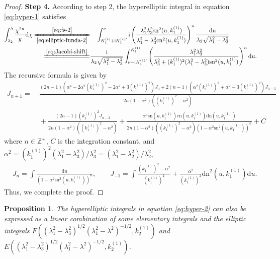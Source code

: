 \documentclass[11pt,reqno]{amsart}
\newcommand{\ii}{\mathrm{i}}
\newcommand{\sn}{\mathrm{sn}}
\newcommand{\cn}{\mathrm{cn}}
\newcommand{\dn}{\mathrm{dn}}
\newcommand{\dd}{\mathrm{d}}
\newtheorem{prop}{Proposition}
\numberwithin{equation}{section}
\begin{document}
\begin{proof}
	\textbf{Step 4.}
	According to step 2, the hyperelliptic integral in equation \eqref{eq:hyper-1} satisfies
	\begin{equation}\label{eq:integral-dn-1}
		\begin{split}
			\int_{\lambda_2}^{\lambda}\frac{\chi^{2n}}{y}\dd \chi
			\xlongequal[\eqref{eq:elliptic-funda-2}]{\eqref{eq:fs-2}} &-\int_{  K^{(1)}_1+\ii   K^{(1)\prime}_1}^{\nu}\ii\left(\frac{\lambda_1^2\lambda_3^2\sn^2(u,  k^{(1)}_1)}{\lambda_1^2-\lambda_3^2\cn^2(u,  k^{(1)}_1)}\right)^n \frac{\dd u}{\lambda_2\sqrt{\lambda_1^2-\lambda_3^2}}\\
			\xlongequal{\eqref{eq:Jacobi-shift}}&\frac{\ii}{\lambda_2\sqrt{\lambda_1^2-\lambda_3^2}}\int_{\nu-\ii K^{(1)\prime}_1}^{   K^{(1)}_1}\left(\frac{\lambda_1^2\lambda_3^2}{\lambda_3^2+  (k^{(1)}_1)^2(\lambda_1^2-\lambda_3^2)\sn^2(u,  k^{(1)}_1)}\right)^n \dd u.
		\end{split}
	\end{equation}
	The recursive formula \cite{ByrdF-54} is given by  
	\begin{equation}\label{eq:integral}
		\begin{split}
			J_{n+1}=&\ \frac{(2n-1)(\alpha^4-2\alpha^2(k^{(1)}_1)^2-2\alpha^2+3(k^{(1)}_1)^2)J_{n}+2(n-1)(\alpha^2(k^{(1)}_1)^2+\alpha^2-3(k^{(1)}_1)^2)J_{n-1}}{2n(1-\alpha^2)((k^{(1)}_1)^2-\alpha^2)}\\
			&\ +\frac{(2n-1)(k^{(1)}_1)^2J_{n-2}}{2n(1-\alpha^2)((k^{(1)}_1)^2-\alpha^2)}+\frac{\alpha^4\sn(u,k^{(1)}_1)\cn(u,k^{(1)}_1)\dn(u,k^{(1)}_1)}{2n(1-\alpha^2)((k^{(1)}_1)^2-\alpha^2)(1-\alpha^2\sn^2(u,k^{(1)}_1))^n}+C
		\end{split}	
	\end{equation}
	where $n\in \mathbb{Z}^+$, $C$ is the integration constant, and $\alpha^2=(k^{(1)}_1)^2(\lambda_1^2-\lambda_3^2)/\lambda_3^2=(\lambda_1^2-\lambda_2^2)/\lambda_2^2$, 
	\begin{equation}
		\begin{split}
			& J_n=\int\frac{\dd u}{(1-\alpha^2\sn^2(u,k^{(1)}_1))^{n}}, \qquad
			 J_{-1}=\int \frac{(k^{(1)}_1)^2-\alpha^2}{(k^{(1)}_1)^2} +\frac{\alpha^2}{(k^{(1)}_1)^2}\dn^2(u,k^{(1)}_1) \dd u.
		\end{split}	
	\end{equation}	
	Thus, we complete the proof.
\end{proof}

\begin{prop}\label{prop:case-2-P}
	The hyperelliptic integrals  in equation \eqref{eq:hyper-2} can also be expressed as a linear combination of some elementary integrals and the elliptic integrals $F((\lambda_1^2-\lambda_3^2)^{1/2}(\lambda_1^2-\lambda^2)^{-1/2},k^{(1)}_2)$ and $E((\lambda_1^2-\lambda_3^2)^{1/2}(\lambda_1^2-\lambda^2)^{-1/2},k^{(1)}_2)$.
\end{prop}
\end{document}
